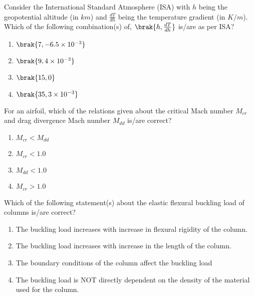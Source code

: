	\item Consider the International Standard Atmosphere (ISA) with $h$ being the geopotential altitude (in $km$) and $\frac{dT}{dh}$ being the temperature gradient (in $K/m$). Which of the following combination(s) of, $\brak{h,\frac{dT}{dh}}$ is/are as per ISA?
		\begin{enumerate}
			\item $\brak{7,-6.5\times10^{-3}}$
			\item $\brak{9,4\times10^{-3}}$
			\item $\brak{15,0}$
			\item $\brak{35,3\times10^{-3}}$
		\end{enumerate}

		
	\item For an airfoil, which of the relations given about the critical Mach number $M_{cr}$ and drag divergence Mach number $M_{dd}$ is/are correct?
		\begin{enumerate}
			\item $M_{cr}<M_{dd}$
			\item $M_{cr}<1.0$
			\item $M_{dd}<1.0$
			\item $M_{cr}>1.0$
		\end{enumerate}

	\item Which of the following statement(s) about the elastic flexural buckling load of columns is/are correct?
		\begin{enumerate}
			\item The buckling load increases with increase in flexural rigidity of the column.
			\item The buckling load increases with increase in the length of the column.
			\item The boundary conditions of the column affect the buckling load
			\item The buckling load is NOT directly dependent on the density of the material used for the column.
		\end{enumerate}


